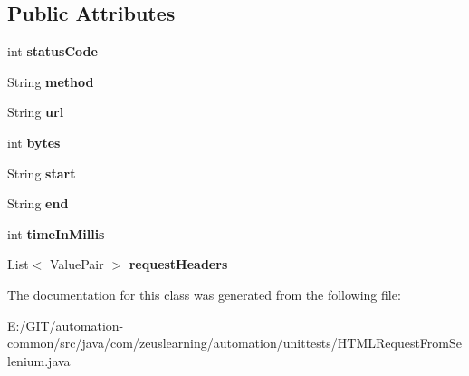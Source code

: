 \subsection*{Public Attributes}
\begin{DoxyCompactItemize}
\item 
\hypertarget{classcom_1_1zeuslearning_1_1automation_1_1unittests_1_1HTMLRequestFromSelenium_a096c96e4945a3099a2fc8ceefa5ad61a}{}\label{classcom_1_1zeuslearning_1_1automation_1_1unittests_1_1HTMLRequestFromSelenium_a096c96e4945a3099a2fc8ceefa5ad61a} 
int {\bfseries status\+Code}
\item 
\hypertarget{classcom_1_1zeuslearning_1_1automation_1_1unittests_1_1HTMLRequestFromSelenium_a33cfda0c4b2d0f622fdd7dd05c4b3443}{}\label{classcom_1_1zeuslearning_1_1automation_1_1unittests_1_1HTMLRequestFromSelenium_a33cfda0c4b2d0f622fdd7dd05c4b3443} 
String {\bfseries method}
\item 
\hypertarget{classcom_1_1zeuslearning_1_1automation_1_1unittests_1_1HTMLRequestFromSelenium_a1bb3049a9502d09252ed909ca2799e48}{}\label{classcom_1_1zeuslearning_1_1automation_1_1unittests_1_1HTMLRequestFromSelenium_a1bb3049a9502d09252ed909ca2799e48} 
String {\bfseries url}
\item 
\hypertarget{classcom_1_1zeuslearning_1_1automation_1_1unittests_1_1HTMLRequestFromSelenium_a060657766c5d6bddffb8e5acc023e946}{}\label{classcom_1_1zeuslearning_1_1automation_1_1unittests_1_1HTMLRequestFromSelenium_a060657766c5d6bddffb8e5acc023e946} 
int {\bfseries bytes}
\item 
\hypertarget{classcom_1_1zeuslearning_1_1automation_1_1unittests_1_1HTMLRequestFromSelenium_adfad2d22c55f9eb178c0ad8ed5e54cc7}{}\label{classcom_1_1zeuslearning_1_1automation_1_1unittests_1_1HTMLRequestFromSelenium_adfad2d22c55f9eb178c0ad8ed5e54cc7} 
String {\bfseries start}
\item 
\hypertarget{classcom_1_1zeuslearning_1_1automation_1_1unittests_1_1HTMLRequestFromSelenium_ac775af7d06ab4adba40da265771cb512}{}\label{classcom_1_1zeuslearning_1_1automation_1_1unittests_1_1HTMLRequestFromSelenium_ac775af7d06ab4adba40da265771cb512} 
String {\bfseries end}
\item 
\hypertarget{classcom_1_1zeuslearning_1_1automation_1_1unittests_1_1HTMLRequestFromSelenium_a9c1264deb51d9b06e7b5d6345db819bc}{}\label{classcom_1_1zeuslearning_1_1automation_1_1unittests_1_1HTMLRequestFromSelenium_a9c1264deb51d9b06e7b5d6345db819bc} 
int {\bfseries time\+In\+Millis}
\item 
\hypertarget{classcom_1_1zeuslearning_1_1automation_1_1unittests_1_1HTMLRequestFromSelenium_a91bf7ee1b4355f9e295f01a2e54657dc}{}\label{classcom_1_1zeuslearning_1_1automation_1_1unittests_1_1HTMLRequestFromSelenium_a91bf7ee1b4355f9e295f01a2e54657dc} 
List$<$ Value\+Pair $>$ {\bfseries request\+Headers}
\end{DoxyCompactItemize}


The documentation for this class was generated from the following file\+:\begin{DoxyCompactItemize}
\item 
E\+:/\+G\+I\+T/automation-\/common/src/java/com/zeuslearning/automation/unittests/H\+T\+M\+L\+Request\+From\+Selenium.\+java\end{DoxyCompactItemize}

